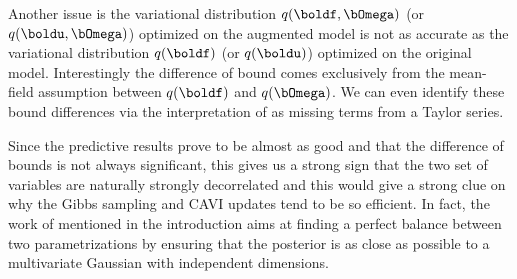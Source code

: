 Another issue is the variational distribution $q(\boldf, \bOmega)$ (or $q(\boldu, \bOmega)$) optimized on the augmented model is not as accurate as the variational distribution $q(\boldf)$ (or $q(\boldu)$) optimized on the original model.
Interestingly the difference of bound comes exclusively from the mean-field assumption between $q(\boldf)$ and $q(\bOmega)$.
We can even identify these bound differences via the interpretation of \citet{} as missing terms from a Taylor series.

Since the predictive results prove to be almost as good and that the difference of bounds is not always significant, this gives us a strong sign that the two set of variables are naturally strongly decorrelated and this would give a strong clue on why the Gibbs sampling and \ac{CAVI} updates tend to be so efficient.
In fact, the work of \citet{gorinovaAutomaticReparameterisationProbabilistic2020} mentioned in the introduction aims at finding a perfect balance between two parametrizations by ensuring that the posterior is as close as possible to a multivariate Gaussian with independent dimensions.




